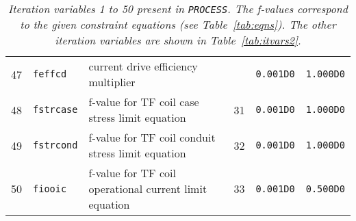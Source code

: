 \documentclass[11pt,a4paper]{report}
\newcommand{\process}{\mbox{\texttt{PROCESS}}}
\begin{document}
\begin{table}[tbph]
\begin{center}
\begin{tabular}{||c|l|l|c|c|c||}
47  & \texttt{feffcd}   & current drive efficiency multiplier           &     & \texttt{0.001D0} & \texttt{1.000D0} \\
48  & \texttt{fstrcase} & f-value for TF coil case stress limit equation & 31  & \texttt{0.001D0} & \texttt{1.000D0} \\
49  & \texttt{fstrcond} & f-value for TF coil conduit stress limit equation & 32  & \texttt{0.001D0} & \texttt{1.000D0} \\
50  & \texttt{fiooic}   & f-value for TF coil operational current limit equation & 33  & \texttt{0.001D0} & \texttt{0.500D0} \\
\hline
\end{tabular}
\end{center}
\caption[List of iteration variables 1 to 50]
{\label{tab:itvars1}
  \textit{Iteration variables 1 to 50 present in \process. The f-values correspond to the
    given constraint equations (see Table~\ref{tab:eqns}). The other iteration
    variables are shown in Table~\ref{tab:itvars2}.}
}
\end{table}
\normalsize
\end{document}
